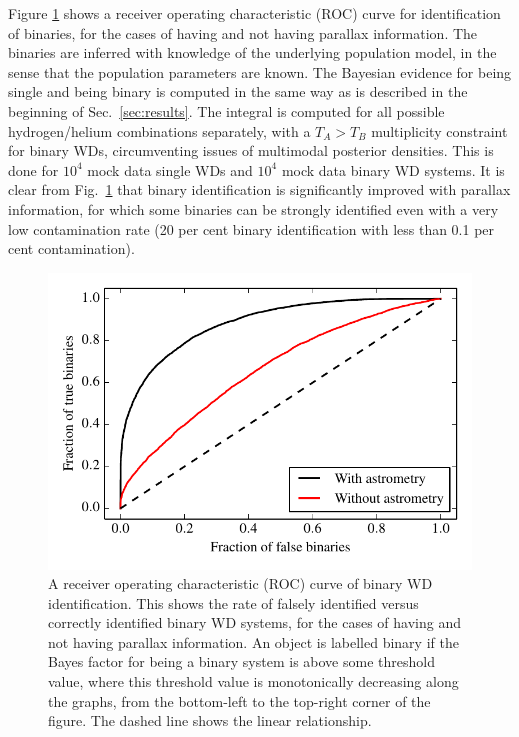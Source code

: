 \documentclass[fleqn,usenatbib]{mnras}
\newcommand{\Teff}{T}
\begin{document}
Figure \ref{fig:ROC_binaries} shows a receiver operating characteristic (ROC) curve for identification of binaries, for the cases of having and not having parallax information. The binaries are inferred with knowledge of the underlying population model, in the sense that the population parameters are known. The Bayesian evidence for being single and being binary is computed in the same way as is described in the beginning of Sec.~\ref{sec:results}. The integral is computed for all possible hydrogen/helium combinations separately, with a $\Teff_A>\Teff_B$ multiplicity constraint for binary WDs, circumventing issues of multimodal posterior densities. This is done for $10^4$ mock data single WDs and $10^4$ mock data binary WD systems. It is clear from Fig.~\ref{fig:ROC_binaries} that binary identification is significantly improved with parallax information, for which some binaries can be strongly identified even with a very low contamination rate (20 per cent binary identification with less than 0.1 per cent contamination).
\begin{figure}
	\includegraphics[width=\columnwidth]{ROC_binaries.pdf}
    \caption{A receiver operating characteristic (ROC) curve of binary WD identification. This shows the rate of falsely identified versus correctly identified binary WD systems, for the cases of having and not having parallax information. An object is labelled binary if the Bayes factor for being a binary system is above some threshold value, where this threshold value is monotonically decreasing along the graphs, from the bottom-left to the top-right corner of the figure. The dashed line shows the linear relationship.}
    \label{fig:ROC_binaries}
\end{figure}
\end{document}
